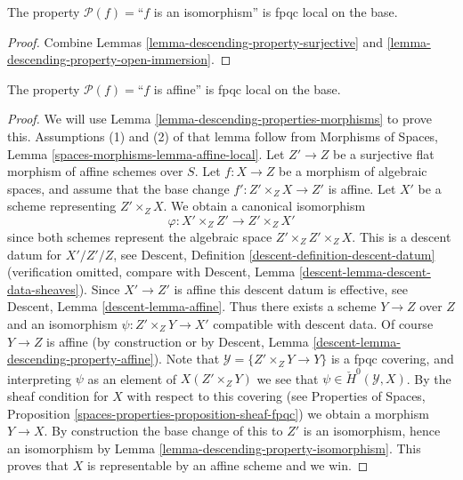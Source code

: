 \begin{lemma}
\label{lemma-descending-property-isomorphism}
The property $\mathcal{P}(f) =$``$f$ is an isomorphism''
is fpqc local on the base.
\end{lemma}

\begin{proof}
Combine Lemmas \ref{lemma-descending-property-surjective}
and \ref{lemma-descending-property-open-immersion}.
\end{proof}

\begin{lemma}
\label{lemma-descending-property-affine}
The property $\mathcal{P}(f) =$``$f$ is affine''
is fpqc local on the base.
\end{lemma}

\begin{proof}
We will use
Lemma \ref{lemma-descending-properties-morphisms}
to prove this. Assumptions (1) and (2) of that lemma follow from
Morphisms of Spaces,
Lemma \ref{spaces-morphisms-lemma-affine-local}.
Let $Z' \to Z$ be a surjective flat morphism of affine schemes over $S$.
Let $f : X \to Z$ be a morphism of algebraic spaces, and assume
that the base change $f' : Z' \times_Z X \to Z'$ is affine.
Let $X'$ be a scheme representing $Z' \times_Z X$.
We obtain a canonical isomorphism
$$
\varphi : X' \times_Z Z' \longrightarrow Z' \times_Z X'
$$
since both schemes represent the algebraic space $Z' \times_Z Z' \times_Z X$.
This is a descent datum for $X'/Z'/Z$, see
Descent, Definition \ref{descent-definition-descent-datum}
(verification omitted, compare with
Descent, Lemma \ref{descent-lemma-descent-data-sheaves}).
Since $X' \to Z'$ is affine this descent datum is effective, see
Descent, Lemma \ref{descent-lemma-affine}.
Thus there exists a scheme $Y \to Z$ over $Z$ and an
isomorphism $\psi : Z' \times_Z Y \to X'$ compatible with descent data.
Of course $Y \to Z$ is affine (by construction or by
Descent, Lemma \ref{descent-lemma-descending-property-affine}).
Note that $\mathcal{Y} = \{Z' \times_Z Y \to Y\}$ is a
fpqc covering, and interpreting $\psi$ as an element of
$X(Z' \times_Z Y)$ we see that $\psi \in \check{H}^0(\mathcal{Y}, X)$.
By the sheaf condition for $X$ with respect to this covering (see
Properties of Spaces, Proposition
\ref{spaces-properties-proposition-sheaf-fpqc})
we obtain a morphism $Y \to X$.
By construction the base change of this to $Z'$ is an isomorphism, hence
an isomorphism by
Lemma \ref{lemma-descending-property-isomorphism}.
This proves that $X$ is representable by an affine scheme and we win.
\end{proof}

